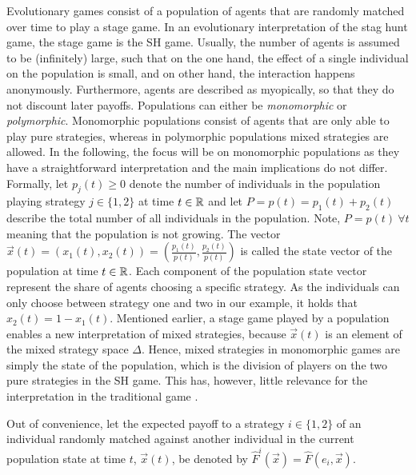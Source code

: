 \label{sec:evolutionarystaghunt}
Evolutionary games consist of a population of agents that are randomly matched 
over time to play a stage game. In an evolutionary interpretation of the 
stag hunt game, the stage game is the SH game. 
Usually, the number of agents is assumed to be (infinitely) large, 
such that on the one hand, the effect of a single individual 
on the population is small, and on 
other hand, the interaction happens anonymously.
Furthermore, agents are described as myopically, so that they do not 
discount later payoffs.
Populations can either be \textit{monomorphic} or \textit{polymorphic}.
Monomorphic populations consist of agents that are only able to play pure
strategies, whereas in polymorphic populations mixed strategies are allowed.
In the following, the focus will be on monomorphic populations as they have
a straightforward interpretation and the main implications do not differ. 
Formally, let $p_j(t) \geq 0$ denote the number of individuals in 
the population playing strategy $j \in \{1,2\}$ at time $t \in \mathbb{R}$ and 
let $P = p(t) = p_1(t) + p_2(t)$ describe the total number of all individuals 
in the population. Note, $P =p(t)\ \forall t$ meaning that the population 
is not growing. The vector $\vec{x}(t) = \left(x_1(t),x_2(t)\right)
=\left(\frac{p_1(t)}{p(t)},\frac{p_2(t)}{p(t)}\right)$ is called the state 
vector of the population at time $t \in \mathbb{R}$. 
Each component of the population state vector represent the share of agents 
choosing a specific strategy. As the individuals can only choose between 
strategy one and two in our example, it holds that  $x_2(t) = 1-x_1(t)$. 
Mentioned earlier, a stage game played by a population enables a 
new interpretation of mixed strategies, because $\vec{x}(t)$ is an 
element of the mixed strategy space $\Delta$.
Hence, mixed strategies in monomorphic games are simply the state
of the population, which is the division of players on the two
pure strategies in the SH game. 
This has, however, little relevance for the interpretation
in the traditional game \parencite[914-915]{rubinstein_comments_1991}.

Out of convenience, let the expected payoff 
to a strategy $i \in \{1,2\}$ of an individual randomly matched
against another individual in the current population state at time $t$, 
$\vec{x}(t)$, be denoted by $\hat{F}^i(\vec{x}) = \hat{F}(e_i,\vec{x})$. 

